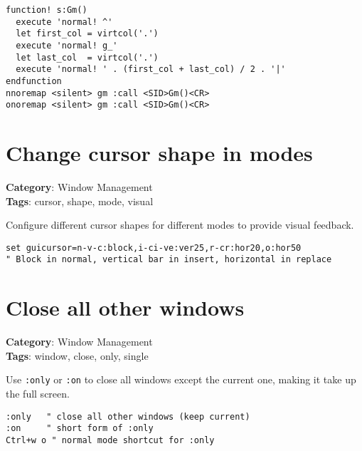 {{{{{{{{{{{{{{{{{{{\begin{Exa*}{}
\begin{Verbatim}[fontsize=\footnotesize, breaklines, breakanywhere]
function! s:Gm()
  execute 'normal! ^'
  let first_col = virtcol('.')
  execute 'normal! g_'
  let last_col  = virtcol('.')
  execute 'normal! ' . (first_col + last_col) / 2 . '|'
endfunction
nnoremap <silent> gm :call <SID>Gm()<CR>
onoremap <silent> gm :call <SID>Gm()<CR>
\end{Verbatim}
\end{Exa*}

\section{Change cursor shape in modes}

\textbf{Category}: Window Management\\ \textbf{Tags}: cursor, shape, mode, visual
\vspace{0.5cm}

Configure different cursor shapes for different modes to provide visual feedback.

\begin{Exa*}{}
\begin{Verbatim}[fontsize=\footnotesize, breaklines, breakanywhere]
set guicursor=n-v-c:block,i-ci-ve:ver25,r-cr:hor20,o:hor50
" Block in normal, vertical bar in insert, horizontal in replace
\end{Verbatim}
\end{Exa*}

\section{Close all other windows}

\textbf{Category}: Window Management\\ \textbf{Tags}: window, close, only, single
\vspace{0.5cm}

Use {\footnotesize \Verb§:only§} or {\footnotesize \Verb§:on§} to close all windows except the current one, making it take up the full screen.

\begin{Exa*}{}
\begin{Verbatim}[fontsize=\footnotesize, breaklines, breakanywhere]
:only   " close all other windows (keep current)
:on     " short form of :only
Ctrl+w o " normal mode shortcut for :only
\end{Verbatim}
\end{Exa*}

}}}}}}}}}}}}}}}}}}}
